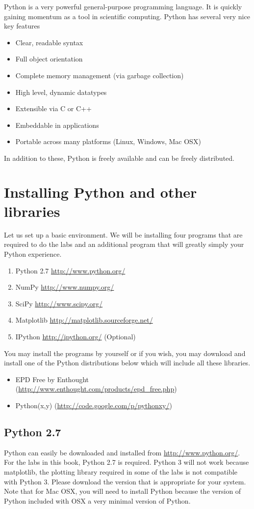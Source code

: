 \label{lab:Essential_Python}

Python is a very powerful general-purpose programming language.  It is quickly gaining momentum as a tool in scientific computing.  Python has several very nice key features
\begin{itemize}
\item Clear, readable syntax
\item Full object orientation
\item Complete memory management (via garbage collection)
\item High level, dynamic datatypes
\item Extensible via C or C++
\item Embeddable in applications
\item Portable across many platforms (Linux, Windows, Mac OSX)
\end{itemize}
In addition to these, Python is freely available and can be freely distributed.

\section*{Installing Python and other libraries}
Let us set up a basic environment.  We will be installing four programs that are required to do the labs and an additional program that will greatly simply your Python experience.
\begin{enumerate}
\item Python 2.7 \url{http://www.python.org/}
\item NumPy \url{http://www.numpy.org/}
\item SciPy \url{http://www.scipy.org/}
\item Matplotlib \url{http://matplotlib.sourceforge.net/}
\item IPython \url{http://ipython.org/} (Optional)
\end{enumerate}
You may install the programs by yourself or if you wish, you may download and install one of the Python distributions below which will include all these libraries.
\begin{itemize}
\item EPD Free by Enthought (\url{http://www.enthought.com/products/epd_free.php})
\item Python(x,y) (\url{http://code.google.com/p/pythonxy/})
\end{itemize}

\subsection*{Python 2.7}
Python can easily be downloaded and installed from \url{http://www.python.org/}.  For the labs in this book, Python 2.7 is required.  Python 3 will not work because matplotlib, the plotting library required in some of the labs is not compatible with Python 3.  Please download the version that is appropriate for your system.  Note that for Mac OSX, you will need to install Python because the version of Python included with OSX a very minimal version of Python.

